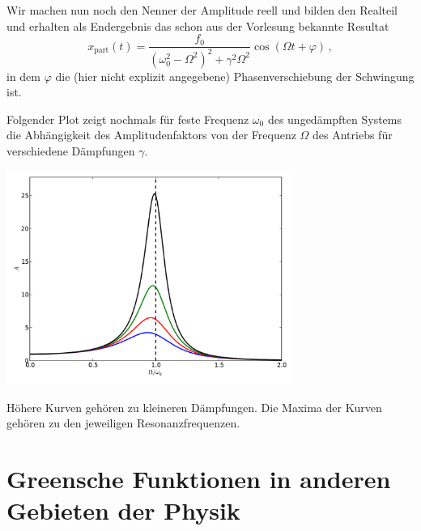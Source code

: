 \documentclass[paper=a4, fontsize=11.0pt, abstractoff, DIV12]{scrartcl}
\newcommand{\xinhom}{\ensuremath{x_\mathrm{part}}}
\begin{document}
Wir machen nun noch den Nenner der Amplitude reell und bilden den Realteil und
erhalten als Endergebnis das schon aus der Vorlesung bekannte Resultat
\begin{equation}
\xinhom(t) = \frac{f_0}{(\omega_0^2 - \Omega^2)^2 + \gamma^2\Omega^2}\cos(\Omega t + \varphi)\,,
\end{equation}
in dem $\varphi$ die (hier nicht explizit angegebene) Phasenverschiebung der Schwingung
ist.

Folgender Plot zeigt nochmals für feste Frequenz $\omega_0$ des ungedämpften
Systems die Abhängigkeit des Amplitudenfaktors von der Frequenz $\Omega$ des
Antriebs für verschiedene Dämpfungen $\gamma$.
\begin{center}
    \includegraphics[width=0.7\textwidth]{ampl-plot.pdf}
\end{center}
Höhere Kurven gehören zu kleineren Dämpfungen. Die Maxima der Kurven gehören zu
den jeweiligen Resonanzfrequenzen.


\section{Greensche Funktionen in anderen Gebieten der Physik}
\end{document}
